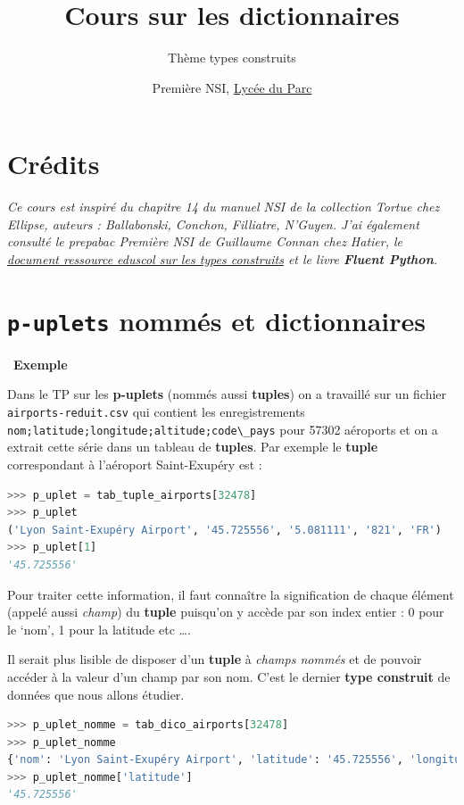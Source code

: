 \documentclass[
  11pt,
]{article}
\title{Cours sur les dictionnaires}
\subtitle{Thème types construits}
\author{Première NSI, \href{https://frederic-junier.org/}{Lycée du Parc}}
\date{}
\newcommand{\passthrough}[1]{#1}
\newcounter{exo}
\newcounter{cours}
\newcounter{exple}
\newenvironment{exemple}[1]
{\par \medskip   \addtocounter{exple}{1} \noindent  
\begin{bclogo}[arrondi =0.1,   noborder = true, logo=\bclampe, marge=4]{~\textbf{Exemple} \textbf{\theexple} {\itshape #1} }  \par}
{
\end{bclogo}
 \par \bigskip }
\begin{document}
\maketitle

\renewcommand*\contentsname{Table des matières}
{
\hypersetup{linkcolor=}
\setcounter{tocdepth}{3}
\tableofcontents
}
\hypertarget{cruxe9dits}{%
\section*{Crédits}\label{cruxe9dits}}

\emph{Ce cours est inspiré du chapitre 14 du manuel NSI de la collection
Tortue chez Ellipse, auteurs : Ballabonski, Conchon, Filliatre, N'Guyen.
J'ai également consulté le prepabac Première NSI de Guillaume Connan
chez Hatier, le
\href{https://cache.media.eduscol.education.fr/file/NSI/77/7/RA_Lycee_G_NSI_repd_types_construits_1170777.pdf}{document
ressource eduscol sur les types construits} et le livre \textbf{Fluent
Python}.}

\hypertarget{p-uplets-nommuxe9s-et-dictionnaires}{%
\section{\texorpdfstring{\texttt{p-uplets} nommés et
dictionnaires}{p-uplets nommés et dictionnaires}}\label{p-uplets-nommuxe9s-et-dictionnaires}}

\begin{exemple}{}

Dans le TP sur les \textbf{p-uplets} (nommés aussi \textbf{tuples}) on a
travaillé sur un fichier \passthrough{\lstinline!airports-reduit.csv!}
qui contient les enregistrements
\passthrough{\lstinline!nom;latitude;longitude;altitude;code\_pays!}
pour 57302 aéroports et on a extrait cette série dans un tableau de
\textbf{tuples}. Par exemple le \textbf{tuple} correspondant à
l'aéroport Saint-Exupéry est :

\begin{lstlisting}[language=Python]
>>> p_uplet = tab_tuple_airports[32478]
>>> p_uplet
('Lyon Saint-Exupéry Airport', '45.725556', '5.081111', '821', 'FR')
>>> p_uplet[1]
'45.725556'
\end{lstlisting}

Pour traiter cette information, il faut connaître la signification de
chaque élément (appelé aussi \emph{champ}) du \textbf{tuple} puisqu'on y
accède par son index entier : 0 pour le `nom', 1 pour la latitude etc
\ldots{}.

Il serait plus lisible de disposer d'un \textbf{tuple} à \emph{champs
nommés} et de pouvoir accéder à la valeur d'un champ par son nom. C'est
le dernier \textbf{type construit} de données que nous allons étudier.

\begin{lstlisting}[language=Python]
>>> p_uplet_nomme = tab_dico_airports[32478]
>>> p_uplet_nomme
{'nom': 'Lyon Saint-Exupéry Airport', 'latitude': '45.725556', 'longitude': '5.081111', 'altitude': '821', 'code_pays': 'FR'}
>>> p_uplet_nomme['latitude']
'45.725556'
\end{lstlisting}

\end{exemple}
\end{document}
